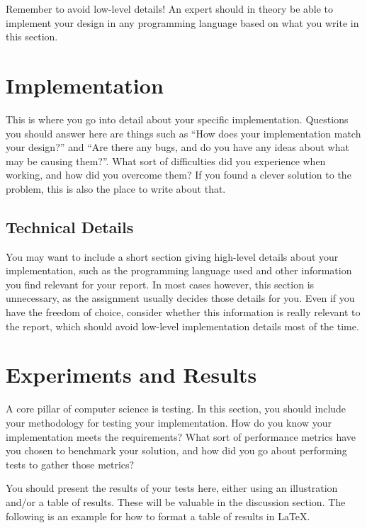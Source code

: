 \documentclass[conference]{IEEEtran}
\begin{document}
Remember to avoid low-level details! An expert should in theory be able to implement your design in any programming language based on what you write in this section.

\section{Implementation}
\label{Section:Implementation}
This is where you go into detail about your specific implementation. Questions you should answer here are things such as ``How does your implementation match your design?'' and ``Are there any bugs, and do you have any ideas about what may be causing them?''. What sort of difficulties did you experience when working, and how did you overcome them? If you found a clever solution to the problem, this is also the place to write about that.

\subsection{Technical Details}
\label{Subsection:Technical_details}
You may want to include a short section giving high-level details about your implementation, such as the programming language used and other information you find relevant for your report. In most cases however, this section is unnecessary, as the assignment usually decides those details for you. Even if you have the freedom of choice, consider whether this information is really relevant to the report, which should avoid low-level implementation details most of the time.

\section{Experiments and Results}
\label{Section:Experiments and Results}
A core pillar of computer science is testing. In this section, you should include your methodology for testing your implementation. How do you know your implementation meets the requirements? What sort of performance metrics have you chosen to benchmark your solution, and how did you go about performing tests to gather those metrics?

You should present the results of your tests here, either using an illustration and/or a table of results. These will be valuable in the discussion section.
The following is an example for how to format a table of results in \LaTeX.
\end{document}
